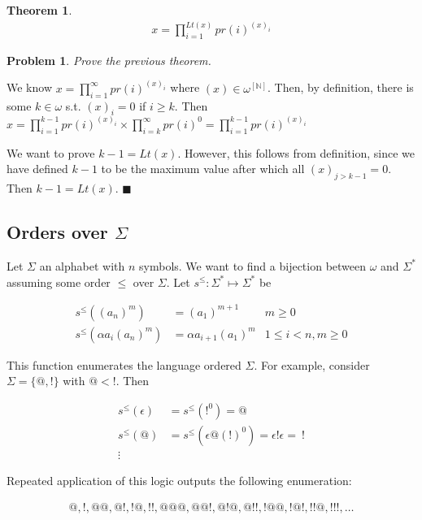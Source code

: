 \documentclass[a4paper, 12pt]{article}
\newtheorem{problem}{Problem}
\newtheorem{theorem}{Theorem}
\newtheorem{problem}{Problem}
\newtheorem{theorem}{Theorem}
\begin{document}
\begin{theorem}
    \begin{align*}
        x = \prod_{i=1}^{Lt(x)}  pr(i)^{(x)_i}
    \end{align*}
\end{theorem}

\begin{problem}
    Prove the previous theorem.
\end{problem}

We know $x = \prod_{i=1}^{\infty} pr(i)^{(x)_i}  $ where $(x) \in
\omega^{[\mathbb{N}]}$. Then, by definition, there is some $k \in \omega$ s.t. $(x)_i = 0$
if $i \geq k$. Then $x = \prod_{i=1}^{k - 1} pr(i)^{(x)_i} \times \prod_{i=k}^{\infty}
pr(i)^{0} = \prod_{i=1}^{k-1} pr(i)^{(x)_i}     $

We want to prove $k - 1 = Lt(x)$. However, this follows from definition, since
we have defined $k - 1$ to be the maximum value after which all $(x)_{j > k -1}
= 0$. Then $k - 1 = Lt(x)$. $\blacksquare$


\subsection{Orders over $\Sigma$}

Let $\Sigma$ an alphabet with $n$ symbols. We want to find a bijection between $\omega$ and
$\Sigma^{*}$ assuming some order $\leq$ over $\Sigma$. Let $s^{\leq} :
\Sigma^{*} \mapsto \Sigma^{*}$ be


\begin{align*}
    s^{\leq} \left( (a_n)^m \right)  &= (a_1)^{m + 1} & m \geq 0\\ 
    s^{\leq} \left( \alpha a_i (a_n)^{m} \right) &= \alpha a_{i+1} (a_1)^{m} & 1
    \leq i < n, m \geq 0
\end{align*}

This function enumerates the language ordered $\Sigma$. For example, consider
$\Sigma = \{@, !\}$ with $@ < !$. Then 

\begin{align*}
    s^{\leq}( \epsilon ) &= s^{\leq}( !^{0} ) = @\\
    s^{\leq}( @ ) &= s^{\leq}( \epsilon @ (!)^{0} ) = \epsilon ! \epsilon = ~!
    \\ 
    \vdots
\end{align*}

Repeated application of this logic outputs the following enumeration: 

\begin{align*}
    @, !, @@, @!, !@, !!, @@@, @@!, @!@, @!!, !@@, !@!, !!@, !!!, \ldots
\end{align*}
\end{document}
